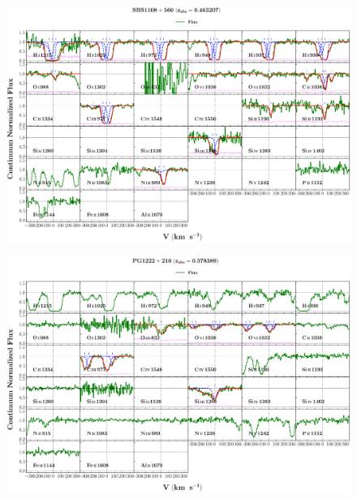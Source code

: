 \documentclass[12pt]{report}
\begin{document}
\begin{landscape}

    \begin{figure}
        \centering
        \vspace{-20mm}
        \hspace*{-35mm}
        \includegraphics[width=1.25\linewidth]{sys_plots_full/SBS1108+560_z=0.463207_sys_plot_full.png}
    \end{figure}
    
\end{landscape}


\begin{landscape}

    \begin{figure}
        \centering
        \vspace{-20mm}
        \hspace*{-35mm}
        \includegraphics[width=1.25\linewidth]{sys_plots_full/PG1222+216_z=0.378389_sys_plot_full.png}
    \end{figure}
    
\end{landscape}
\end{document}
